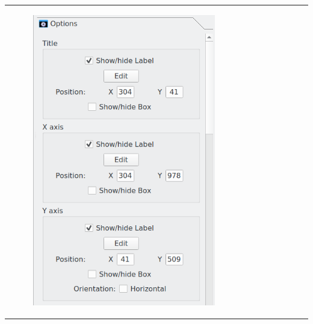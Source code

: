 \documentclass[10pt]{article}
\begin{document}
\begin{tabular}{lcr}
\begin{minipage}{.3\linewidth}
\hspace*{-3mm}
\begin{figure}[H]
\begin{center}
\vspace*{-12mm}
\includegraphics[width=.73\linewidth]{damqt320_2D_options_1.png}
\end{center}
\end{figure}
\end{minipage}
&
\begin{minipage}{.3\linewidth}
\hspace*{-3mm}
\begin{figure}[H]
\begin{center}
\vspace*{1mm}

\end{center}
\end{figure}
\end{minipage}
\end{tabular}
\end{document}
